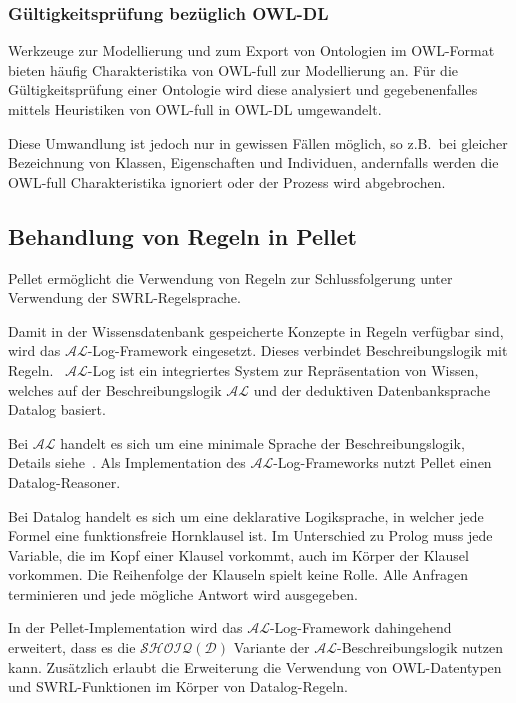 \subsubsection{Gültigkeitsprüfung bezüglich OWL-DL}
\label{ssubsection:inferenz_pellet_owldl}
Werkzeuge zur Modellierung und zum Export von Ontologien im OWL-Format bieten häufig Charakteristika von OWL-full zur Modellierung an. Für die Gültigkeitsprüfung einer Ontologie wird diese analysiert und gegebenenfalles mittels Heuristiken von OWL-full in OWL-DL umgewandelt.

Diese Umwandlung ist jedoch nur in gewissen Fällen möglich, so z.B.\ bei gleicher Bezeichnung von Klassen, Eigenschaften und Individuen, andernfalls werden die OWL-full Charakteristika ignoriert oder der Prozess wird abgebrochen.

\subsection{Behandlung von Regeln in Pellet}
\label{subsection:inferenz_pellet_swrl}
Pellet ermöglicht die Verwendung von Regeln zur Schlussfolgerung unter Verwendung der SWRL-Regelsprache.

Damit in der Wissensdatenbank gespeicherte Konzepte in Regeln verfügbar sind, wird das $\mathcal{AL}$-Log-Framework eingesetzt. Dieses verbindet Beschreibungslogik mit Regeln.~\cite[S. 4,5]{sirin:pellet07} $\mathcal{AL}$-Log ist ein integriertes System zur Repräsentation von Wissen, welches auf der Beschreibungslogik $\mathcal{AL}$ und der deduktiven Datenbanksprache Datalog basiert.~\cite{allog}

Bei $\mathcal{AL}$ handelt es sich um eine minimale Sprache der Beschreibungslogik, Details siehe~\cite[S. 51]{dl:baader2003}. Als Implementation des $\mathcal{AL}$-Log-Frameworks nutzt Pellet einen Datalog-Reasoner.~\cite[S. 4 - 5]{sirin:pellet07}

Bei Datalog handelt es sich um eine deklarative Logiksprache, in welcher jede Formel eine funktionsfreie Hornklausel ist. Im Unterschied zu Prolog muss jede Variable, die im Kopf einer Klausel vorkommt, auch im Körper der Klausel vorkommen. Die Reihenfolge der Klauseln spielt keine Rolle. Alle Anfragen terminieren und jede mögliche Antwort wird ausgegeben.~\cite{datalog}

In der Pellet-Implementation wird das $\mathcal{AL}$-Log-Framework dahingehend erweitert, dass es die $\mathcal{SHOIQ}(\mathcal{D})$ Variante  der $\mathcal{AL}$-Beschreibungslogik nutzen kann. Zusätzlich erlaubt die Erweiterung die Verwendung von OWL-Datentypen und SWRL-Funktionen im Körper von Datalog-Regeln.~\cite[S. 5]{sirin:pellet07}

